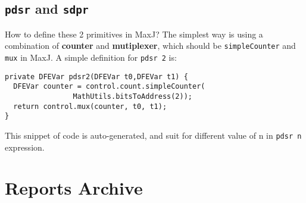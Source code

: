 \documentclass[a4paper, 10pt]{article}
\begin{document}
\subsection{\texttt{pdsr} and \texttt{sdpr}}
How to define these 2 primitives in MaxJ? The simplest way is using a combination of \textbf{counter} and \textbf{mutiplexer}, which should be \texttt{simpleCounter} and \texttt{mux} in MaxJ. A simple definition for \texttt{pdsr 2} is:

\begin{lstlisting}
private DFEVar pdsr2(DFEVar t0,DFEVar t1) {
  DFEVar counter = control.count.simpleCounter(
    			MathUtils.bitsToAddress(2));
  return control.mux(counter, t0, t1);
}
\end{lstlisting}

This snippet of code is auto-generated, and suit for different value of n in \texttt{pdsr n} expression.

\newpage

\section{Reports Archive}
 \newpage
 \newpage
   
\end{document}
